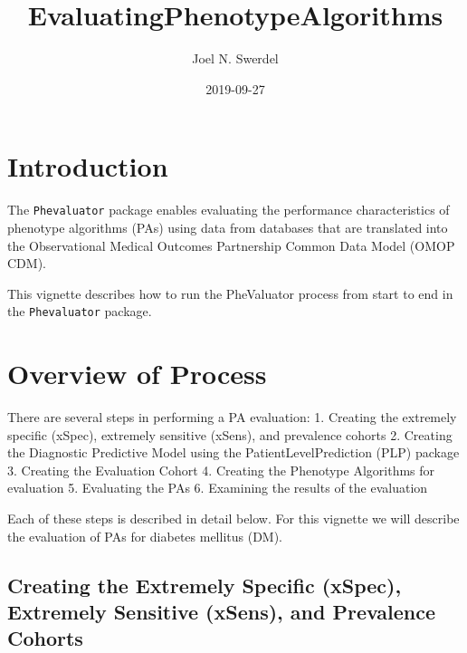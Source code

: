 \documentclass[]{article}
\title{EvaluatingPhenotypeAlgorithms}
\author{Joel N. Swerdel}
\date{2019-09-27}
\begin{document}
\maketitle

{
\setcounter{tocdepth}{3}
\tableofcontents
}
\newpage

\hypertarget{introduction}{%
\section{Introduction}\label{introduction}}

The \texttt{Phevaluator} package enables evaluating the performance
characteristics of phenotype algorithms (PAs) using data from databases
that are translated into the Observational Medical Outcomes Partnership
Common Data Model (OMOP CDM).

This vignette describes how to run the PheValuator process from start to
end in the \texttt{Phevaluator} package.

\hypertarget{overview-of-process}{%
\section{Overview of Process}\label{overview-of-process}}

There are several steps in performing a PA evaluation: 1. Creating the
extremely specific (xSpec), extremely sensitive (xSens), and prevalence
cohorts 2. Creating the Diagnostic Predictive Model using the
PatientLevelPrediction (PLP) package 3. Creating the Evaluation Cohort
4. Creating the Phenotype Algorithms for evaluation 5. Evaluating the
PAs 6. Examining the results of the evaluation

Each of these steps is described in detail below. For this vignette we
will describe the evaluation of PAs for diabetes mellitus (DM).

\hypertarget{creating-the-extremely-specific-xspec-extremely-sensitive-xsens-and-prevalence-cohorts}{%
\subsection{Creating the Extremely Specific (xSpec), Extremely Sensitive
(xSens), and Prevalence
Cohorts}\label{creating-the-extremely-specific-xspec-extremely-sensitive-xsens-and-prevalence-cohorts}}
\end{document}

